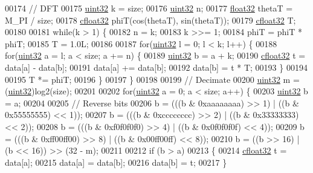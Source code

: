 \begin{DoxyCode}
00174         \textcolor{comment}{// DFT}
00175         \hyperlink{definitions_8hpp_a1134b580f8da4de94ca6b1de4d37975e}{uint32} k = size;
00176         \hyperlink{definitions_8hpp_a1134b580f8da4de94ca6b1de4d37975e}{uint32} n;
00177         \hyperlink{definitions_8hpp_aacdc525d6f7bddb3ae95d5c311bd06a1}{float32} thetaT = M\_PI / size;
00178         \hyperlink{definitions_8hpp_a960be6b6614c08090c16574dba10a421}{cfloat32} phiT(cos(thetaT), sin(thetaT));
00179         \hyperlink{definitions_8hpp_a960be6b6614c08090c16574dba10a421}{cfloat32} T;
00180 
00181         \textcolor{keywordflow}{while}(k > 1) \{
00182             n = k;
00183             k >>= 1;
00184             phiT = phiT * phiT;
00185             T = 1.0L;
00186 
00187             \textcolor{keywordflow}{for}(\hyperlink{definitions_8hpp_a1134b580f8da4de94ca6b1de4d37975e}{uint32} l = 0; l < k; l++) \{
00188                 \textcolor{keywordflow}{for}(\hyperlink{definitions_8hpp_a1134b580f8da4de94ca6b1de4d37975e}{uint32} a = l; a < size; a += n) \{
00189                     \hyperlink{definitions_8hpp_a1134b580f8da4de94ca6b1de4d37975e}{uint32} b = a + k;
00190                     \hyperlink{definitions_8hpp_a960be6b6614c08090c16574dba10a421}{cfloat32} t = data[a] - data[b];
00191                     data[a] += data[b];
00192                     data[b] = t * T;
00193                 \}
00194 
00195                 T *= phiT;
00196             \}
00197         \}
00198 
00199         \textcolor{comment}{// Decimate}
00200         \hyperlink{definitions_8hpp_a1134b580f8da4de94ca6b1de4d37975e}{uint32} m = (\hyperlink{definitions_8hpp_a1134b580f8da4de94ca6b1de4d37975e}{uint32})log2(size);
00201 
00202         \textcolor{keywordflow}{for}(\hyperlink{definitions_8hpp_a1134b580f8da4de94ca6b1de4d37975e}{uint32} a = 0; a < size; a++) \{
00203             \hyperlink{definitions_8hpp_a1134b580f8da4de94ca6b1de4d37975e}{uint32} b = a;
00204 
00205             \textcolor{comment}{// Reverse bits}
00206             b = (((b & 0xaaaaaaaa) >> 1) | ((b & 0x55555555) << 1));
00207             b = (((b & 0xcccccccc) >> 2) | ((b & 0x33333333) << 2));
00208             b = (((b & 0xf0f0f0f0) >> 4) | ((b & 0x0f0f0f0f) << 4));
00209             b = (((b & 0xff00ff00) >> 8) | ((b & 0x00ff00ff) << 8));
00210             b = ((b >> 16) | (b << 16)) >> (32 - m);
00211 
00212             \textcolor{keywordflow}{if} (b > a)
00213             \{
00214                 \hyperlink{definitions_8hpp_a960be6b6614c08090c16574dba10a421}{cfloat32} t = data[a];
00215                 data[a] = data[b];
00216                 data[b] = t;
00217             \}

\end{DoxyCode}
